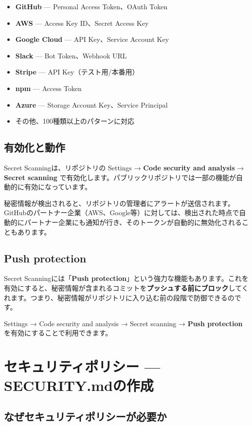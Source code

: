 \begin{itemize}
  \item \textbf{GitHub} --- Personal Access Token、OAuth Token
  \item \textbf{AWS} --- Access Key ID、Secret Access Key
  \item \textbf{Google Cloud} --- API Key、Service Account Key
  \item \textbf{Slack} --- Bot Token、Webhook URL
  \item \textbf{Stripe} --- API Key（テスト用/本番用）
  \item \textbf{npm} --- Access Token
  \item \textbf{Azure} --- Storage Account Key、Service Principal
  \item その他、100種類以上のパターンに対応
\end{itemize}

\subsection{有効化と動作}

Secret Scanningは、リポジトリの Settings → \textbf{Code security and analysis} → \textbf{Secret scanning} で有効化します。パブリックリポジトリでは一部の機能が自動的に有効になっています。

秘密情報が検出されると、リポジトリの管理者にアラートが送信されます。GitHubのパートナー企業（AWS、Google等）に対しては、検出された時点で自動的にパートナー企業にも通知が行き、そのトークンが自動的に無効化されることもあります。

\subsection{Push protection}

Secret Scanningには「\textbf{Push protection}」という強力な機能もあります。これを有効にすると、秘密情報が含まれるコミットを\textbf{プッシュする前にブロック}してくれます。つまり、秘密情報がリポジトリに入り込む前の段階で防御できるのです。

Settings → Code security and analysis → Secret scanning → \textbf{Push protection} を有効にすることで利用できます。

\section{セキュリティポリシー --- SECURITY.mdの作成}

\subsection{なぜセキュリティポリシーが必要か}

